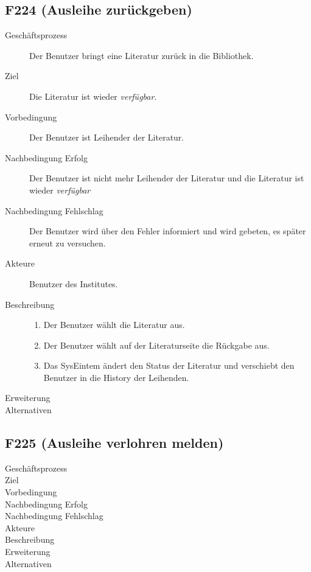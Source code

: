 \subsection{F224 (Ausleihe zurückgeben)}
\begin{description}
  \item[Geschäftsprozess]Der Benutzer bringt eine Literatur zurück in die Bibliothek.
  \item[Ziel]Die Literatur ist wieder \emph{verfügbar}.
  \item[Vorbedingung]Der Benutzer ist Leihender der Literatur.
  \item[Nachbedingung Erfolg]Der Benutzer ist nicht mehr Leihender der Literatur und die Literatur ist wieder \emph{verfügbar}
  \item[Nachbedingung Fehlschlag]Der Benutzer wird über den Fehler informiert und wird gebeten, es später erneut zu versuchen.
  \item[Akteure]Benutzer des Institutes.
  \item[Beschreibung]
    \begin{enumerate}
      \item Der Benutzer wählt die Literatur aus.
      \item Der Benutzer wählt auf der Literaturseite die Rückgabe aus.
      \item Das SysEintem ändert den Status der Literatur und verschiebt den Benutzer in die History der Leihenden.
    \end{enumerate}
  \item[Erweiterung]
  \item[Alternativen]
\end{description}

\subsection{F225 (Ausleihe verlohren melden)}
\begin{description}
  \item[Geschäftsprozess]
  \item[Ziel]
  \item[Vorbedingung]
  \item[Nachbedingung Erfolg]
  \item[Nachbedingung Fehlschlag]
  \item[Akteure]
  \item[Beschreibung]
  \item[Erweiterung]
  \item[Alternativen]
\end{description}

